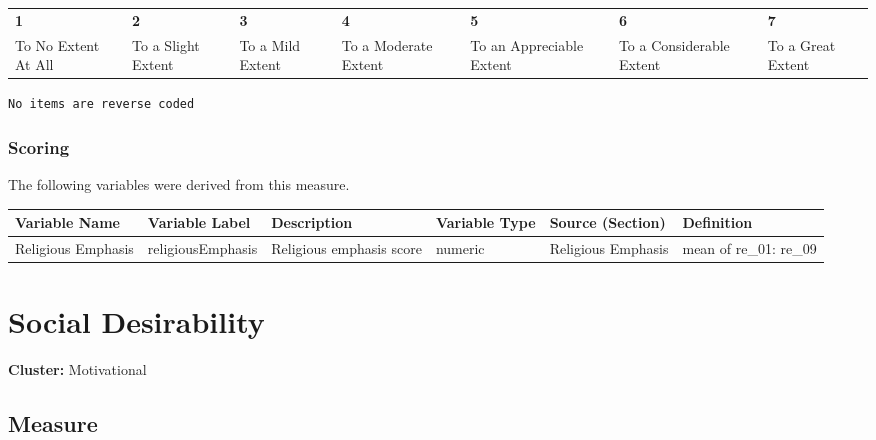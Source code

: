 \documentclass[
  letterpaper,
]{scrbook}
\begin{document}
\begin{longtable}[]{@{}
  >{\raggedright\arraybackslash}p{}
  >{\raggedright\arraybackslash}p{}
  >{\raggedright\arraybackslash}p{}
  >{\raggedright\arraybackslash}p{}
  >{\raggedright\arraybackslash}p{}
  >{\raggedright\arraybackslash}p{}
  >{\raggedright\arraybackslash}p{}@{}}
\toprule\noalign{}
\endhead
\bottomrule\noalign{}
\endlastfoot
\textbf{1} & \textbf{2} & \textbf{3} & \textbf{4} & \textbf{5} &
\textbf{6} & \textbf{7} \\
To No Extent At All & To a Slight Extent & To a Mild Extent & To a
Moderate Extent & To an Appreciable Extent & To a Considerable Extent &
To a Great Extent \\
\end{longtable}

\texttt{No\ items\ are\ reverse\ coded}

\subsection{Scoring}\label{scoring-6}

The following variables were derived from this measure.

\begin{tabu} to 
\toprule
Variable Name & Variable Label & Description & Variable Type & Source (Section) & Definition\\
\midrule
Religious Emphasis & religiousEmphasis & Religious emphasis score & numeric & Religious Emphasis & mean of re\_01: re\_09\\
\bottomrule
\end{tabu}

\chapter{Social Desirability}\label{social-desirability}

\textbf{Cluster:} Motivational

\section{Measure}\label{measure-7}
\end{document}
